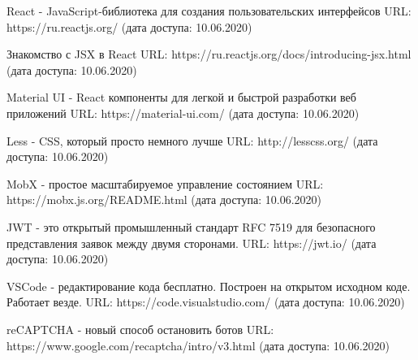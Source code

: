 \documentclass[12pt, a4paper]{diplom}
\begin{document}
\renewcommand{\bibname}{Список литературы}
\begin{thebibliography}{9}

React - JavaScript-библиотека для создания пользовательских интерфейсов
URL: https://ru.reactjs.org/
(дата доступа: 10.06.2020)

Знакомство с JSX в React
URL: https://ru.reactjs.org/docs/introducing-jsx.html
(дата доступа: 10.06.2020)

Material UI - React компоненты для легкой и быстрой разработки веб приложений
URL: https://material-ui.com/
(дата доступа: 10.06.2020)

Less - CSS, который просто немного лучше
URL: http://lesscss.org/
(дата доступа: 10.06.2020)

MobX - простое масштабируемое управление состоянием
URL: https://mobx.js.org/README.html
(дата доступа: 10.06.2020)

JWT - это открытый промышленный стандарт  RFC 7519 для безопасного представления заявок между двумя сторонами.
URL: https://jwt.io/
(дата доступа: 10.06.2020)

VSCode - редактирование кода бесплатно. Построен на открытом исходном коде. Работает везде.
URL: https://code.visualstudio.com/
(дата доступа: 10.06.2020)

reCAPTCHA - новый способ остановить ботов
URL: https://www.google.com/recaptcha/intro/v3.html
(дата доступа: 10.06.2020)

\end{thebibliography}
\end{document}
